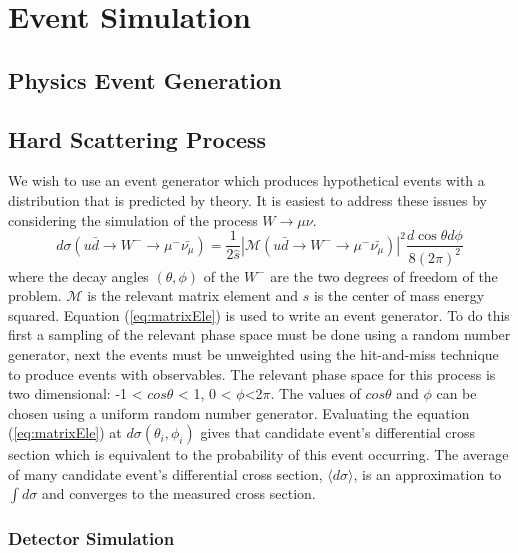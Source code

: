 \chapter{Event Simulation}
\section{Physics Event Generation}
\section{Hard Scattering Process}
We wish to use an event generator which produces hypothetical events with a distribution
that is predicted by theory.
It is easiest to address these issues by considering the simulation of 
the process $W\rightarrow\mu\nu$. 
\begin{equation}
d\sigma(u\bar{d}\rightarrow W^{-}\rightarrow \mu^{-}\bar{\nu_{\mu}})
=\frac{1}{2\hat{s}}|\mathcal{M}(u\bar{d}\rightarrow W^{-}\rightarrow \mu^{-}\bar{\nu_{\mu}})|^{2}
\frac{d\cos\theta d\phi}{8(2\pi)^{2}}
\label{eq:matrixEle}
\end{equation}
where the decay angles $(\theta,\phi)$ of the $W^{-}$ are the two degrees of
freedom of the problem. $\mathcal{M}$ is the relevant matrix element and $\hat{s}$
is the center of mass energy squared.
Equation (\ref{eq:matrixEle}) is used to write an event generator. 
To do this first a sampling of the relevant phase
space must be done using a random number generator, next the events must
be unweighted using the hit-and-miss technique to produce events with observables. %
The relevant phase space for this process is two dimensional: -1 < $cos\theta$ < 1,
0 < $\phi$<2$\pi$. The values of $cos\theta$ and $\phi$ can be chosen using
a uniform random number generator. 
Evaluating the equation (\ref{eq:matrixEle}) at $d\sigma(\theta_{i},\phi_{i})$ gives
that candidate event's differential cross section which is equivalent to the 
probability of this event occurring. The average of many candidate event's differential
cross section, $\langle d\sigma\rangle$, is an approximation to $\int d\sigma$ and converges
to the measured cross section.



\subsection{Detector Simulation}
